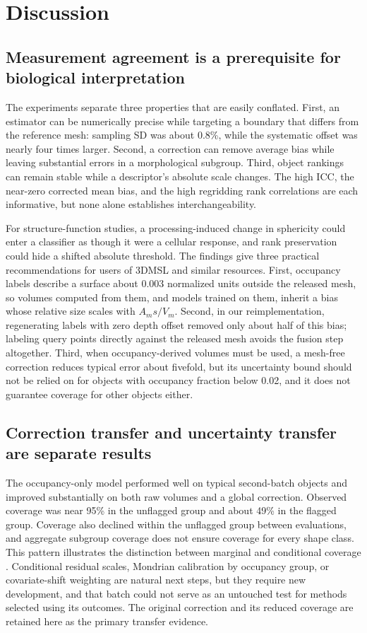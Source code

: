 \documentclass[journal]{IEEEtran}
\begin{document}
\section{Discussion}

\subsection{Measurement agreement is a prerequisite for biological interpretation}

The experiments separate three properties that are easily conflated. First, an estimator can be numerically precise while targeting a boundary that differs from the reference mesh: sampling SD was about 0.8\%, while the systematic offset was nearly four times larger. Second, a correction can remove average bias while leaving substantial errors in a morphological subgroup. Third, object rankings can remain stable while a descriptor's absolute scale changes. The high ICC, the near-zero corrected mean bias, and the high regridding rank correlations are each informative, but none alone establishes interchangeability.

For structure-function studies, a processing-induced change in sphericity could enter a classifier as though it were a cellular response, and rank preservation could hide a shifted absolute threshold. The findings give three practical recommendations for users of 3DMSL and similar resources. First, occupancy labels describe a surface about 0.003 normalized units outside the released mesh, so volumes computed from them, and models trained on them, inherit a bias whose relative size scales with $A_ms/V_m$. Second, in our reimplementation, regenerating labels with zero depth offset removed only about half of this bias; labeling query points directly against the released mesh avoids the fusion step altogether. Third, when occupancy-derived volumes must be used, a mesh-free correction reduces typical error about fivefold, but its uncertainty bound should not be relied on for objects with occupancy fraction below 0.02, and it does not guarantee coverage for other objects either.

\subsection{Correction transfer and uncertainty transfer are separate results}

The occupancy-only model performed well on typical second-batch objects and improved substantially on both raw volumes and a global correction. Observed coverage was near 95\% in the unflagged group and about 49\% in the flagged group. Coverage also declined within the unflagged group between evaluations, and aggregate subgroup coverage does not ensure coverage for every shape class. This pattern illustrates the distinction between marginal and conditional coverage \cite{ref29}. Conditional residual scales, Mondrian calibration by occupancy group, or covariate-shift weighting \cite{ref28} are natural next steps, but they require new development, and that batch could not serve as an untouched test for methods selected using its outcomes. The original correction and its reduced coverage are retained here as the primary transfer evidence.
\end{document}
